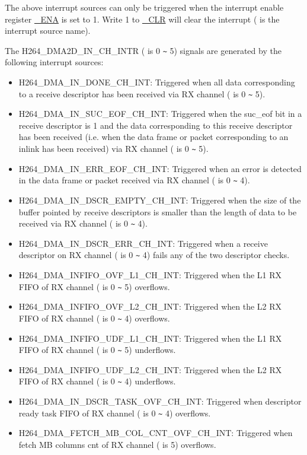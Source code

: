 \documentclass[main\_\_EN.tex]{subfiles}
\begin{document}
The above interrupt sources can only be triggered when the interrupt enable register \hyperref[fielddesc:H264DMAMOVE2MBLINEDONEINTENA]{\_ENA} is set to 1. Write 1 to \hyperref[fielddesc:H264DMAMOVE2MBLINEDONEINTCLR]{\_CLR} will clear the interrupt ( is the interrupt source name).

The H264\_DMA2D\_IN\_CH\_INTR ( is 0 \verb+~+ 5) signals are generated by the following interrupt sources:

\begin{itemize}
\item H264\_DMA\_IN\_DONE\_CH\_INT: Triggered when all data corresponding to a receive descriptor has been received via RX channel  ( is 0 \verb+~+ 5).
\item H264\_DMA\_IN\_SUC\_EOF\_CH\_INT: Triggered when the suc\_eof bit in a receive descriptor is 1 and the data corresponding to this receive descriptor has been received (i.e. when the data frame or packet corresponding to an inlink has been received) via RX channel  ( is 0 \verb+~+ 5).
\item H264\_DMA\_IN\_ERR\_EOF\_CH\_INT: Triggered when an error is detected in the data frame or packet received via RX channel  ( is 0 \verb+~+ 4).
\item H264\_DMA\_IN\_DSCR\_EMPTY\_CH\_INT: Triggered when the size of the buffer pointed by receive descriptors is smaller than the length of data to be received via RX channel  ( is 0 \verb+~+ 4).
\item H264\_DMA\_IN\_DSCR\_ERR\_CH\_INT: Triggered when a receive descriptor on RX channel  ( is 0 \verb+~+ 4) fails any of the two descriptor checks.
\item H264\_DMA\_INFIFO\_OVF\_L1\_CH\_INT: Triggered when the L1 RX FIFO of RX channel  ( is 0 \verb+~+ 5) overflows.
\item H264\_DMA\_INFIFO\_OVF\_L2\_CH\_INT: Triggered when the L2 RX FIFO of RX channel  ( is 0 \verb+~+ 4) overflows.
\item H264\_DMA\_INFIFO\_UDF\_L1\_CH\_INT: Triggered when the L1 RX FIFO of RX channel  ( is 0 \verb+~+ 5) underflows.
\item H264\_DMA\_INFIFO\_UDF\_L2\_CH\_INT: Triggered when the L2 RX FIFO of RX channel  ( is 0 \verb+~+ 4) underflows.
\item H264\_DMA\_IN\_DSCR\_TASK\_OVF\_CH\_INT: Triggered when descriptor ready task FIFO of RX channel  ( is 0 \verb+~+ 4) overflows.
\item H264\_DMA\_FETCH\_MB\_COL\_CNT\_OVF\_CH\_INT: Triggered when fetch MB columns cnt of RX channel  ( is 5) overflows.
\end{itemize}
\end{document}
